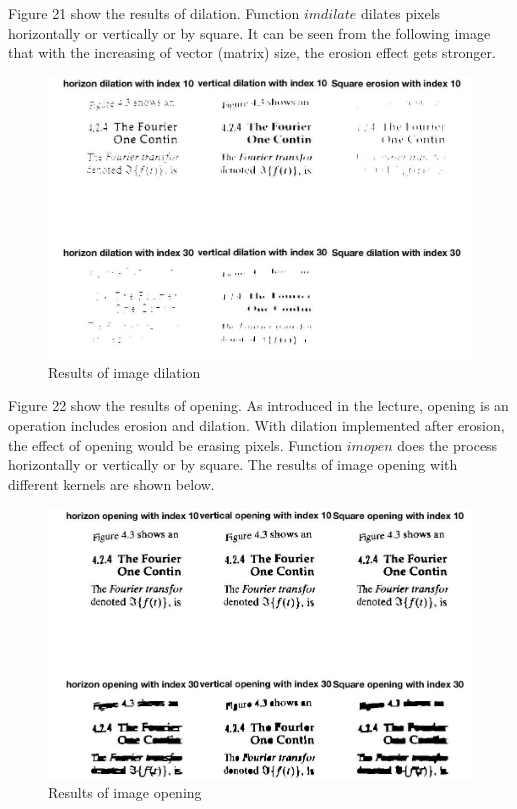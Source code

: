 \documentclass{article}
\begin{document}
Figure 21 show the results of dilation. Function $imdilate$ dilates pixels horizontally or vertically or by square. It can be seen from the following image that with the increasing of vector (matrix) size, the erosion effect gets stronger. 


\begin{figure}[htbp]
    \centering
    \includegraphics[scale = 0.28]{fig18.jpg}
    \caption{Results of image dilation}
    \label{fig18}
\end{figure}

Figure 22 show the results of opening. As introduced in the lecture, opening is an operation includes erosion and dilation. With dilation implemented after erosion, the effect of opening would be erasing pixels. Function $imopen$ does the process horizontally or vertically or by square. The results of image opening with different kernels are shown below. 

\begin{figure}[htbp]
    \centering
    \includegraphics[scale = 0.28]{fig19.jpg}
    \caption{Results of image opening}
    \label{fig19}
\end{figure}
\end{document}
